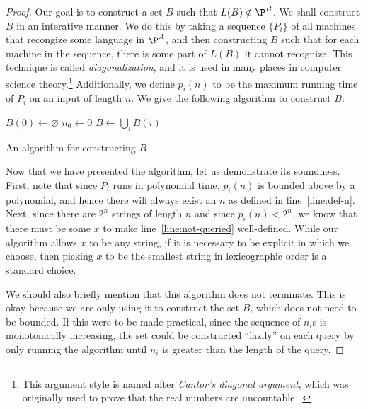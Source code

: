 \documentclass[english]{reedthesis}
\theoremstyle{plain}
\theoremstyle{definition}
\theoremstyle{remark}
\begin{document}
\begin{proof}
  Our goal is to construct a set $B$ such that $L(B) \notin \P^{B}$. We shall
  construct $B$ in an interative manner. We do this by taking a sequence
  $\{P_{i}\}$ of all machines that recongize some language in $\P^{A}$, and then
  constructing $B$ such that for each machine in the sequence, there is some
  part of $L(B)$ it cannot recognize. This technique is called
  \emph{diagonalization}, and it is used in many places in computer science
  theory.\footnote{This argument style is named after \emph{Cantor's diagonal
      argument}, which was originally used to prove that the real numbers are
    uncountable~\cite[Thm. 2.14]{Ru76}.} Additionally, we define $p_{i}(n)$ to
  be the maximum running time of $P_{i}$ on an input of length $n$. We give the
  following algorithm to construct $B$:

  \begin{algorithm}[H]
    $B(0) \leftarrow \varnothing$\;
    $n_{0} \leftarrow 0$\;
    $B \leftarrow \bigcup_{i}B(i)$\;
    \caption{An algorithm for constructing $B$}\label{alg:construct-b}
  \end{algorithm}

  Now that we have presented the algorithm, let us demonstrate its soundness.
  First, note that since $P_{i}$ runs in polynomial time, $p_{i}(n)$ is bounded
  above by a polynomial, and hence there will always exist an $n$ as defined in
  line~\ref{line:def-n}. Next, since there are $2^{n}$ strings of length $n$ and
  since $p_{i}(n) < 2^{n}$, we know that there must be some $x$ to make
  line~\ref{line:not-queried} well-defined. While our algorithm allows $x$ to be
  any string, if it is necessary to be explicit in which we choose, then picking
  $x$ to be the smallest string in lexicographic order is a standard choice.

  We should also briefly mention that this algorithm does not terminate. This is
  okay because we are only using it to construct the set $B$, which does not
  need to be bounded. If this were to be made practical, since the sequence of
  $n_{i}$s is monotonically increasing, the set could be constructed ``lazily''
  on each query by only running the algorithm until $n_{i}$ is greater than the
  length of the query.


\end{proof}
\end{document}
